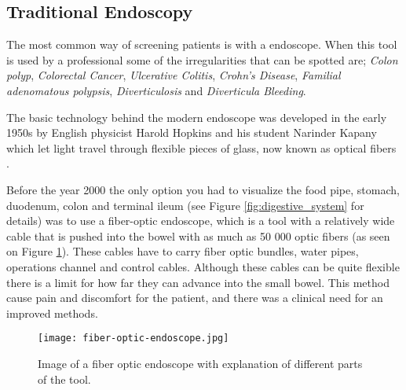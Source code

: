 \documentclass[thesis.tex]{subfiles}
\begin{document}
\subsection{Traditional Endoscopy}
The most common way of screening patients is with a endoscope. When this tool is used by a professional some of the irregularities that can be spotted are; \textit{Colon polyp}, \textit{Colorectal Cancer}, \textit{Ulcerative Colitis}, \textit{Crohn's Disease}, \textit{Familial adenomatous polypsis}, \textit{Diverticulosis} and \textit{Diverticula Bleeding}.

The basic technology behind the modern endoscope was developed in the early 1950s by English physicist Harold Hopkins and his student Narinder Kapany which let light travel through flexible pieces of glass, now known as optical fibers \cite{NewMethod54}.

Before the year 2000 the only option you had to visualize the food pipe, stomach, duodenum, colon and terminal ileum (see Figure \ref{fig:digestive_system} for details) was to use a fiber-optic endoscope, which is a tool with a relatively wide cable that is pushed into the bowel with as much as 50 000 optic fibers (as seen on Figure \ref{fig:fiber-optic-endoscopy}). These cables have to carry fiber optic bundles, water pipes, operations channel and control cables. Although these cables can be quite flexible there is a limit for how far they can advance into the small bowel. This method cause pain and discomfort for the patient, and there was a clinical need for an improved methods.

\begin{figure} %
  \begin{center}
    \texttt{[image: fiber-optic-endoscope.jpg]}
    \caption[Image of a fiber optic endoscope with explanation of different parts of the tool]{Image of a fiber optic endoscope with explanation of different parts of the tool\footnotemark.}
    \label{fig:fiber-optic-endoscopy}
  \end{center}
\end{figure}

\end{document}
